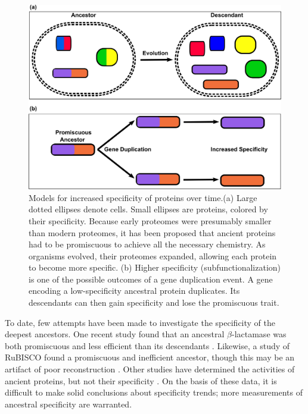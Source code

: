\begin{figure}
\centering \includegraphics{ch2-fig3} \caption[Models for increased specificity of proteins over time]{Models for increased specificity of proteins over time.(a) Large
dotted ellipses denote cells. Small ellipses are proteins, colored
by their specificity. Because early proteomes were presumably smaller
than modern proteomes, it has been proposed that ancient proteins
had to be promiscuous to achieve all the necessary chemistry. As organisms
evolved, their proteomes expanded, allowing each protein to become
more specific. (b) Higher specificity (subfunctionalization) is one
of the possible outcomes of a gene duplication event. A gene encoding
a low-specificity ancestral protein duplicates. Its descendants can
then gain specificity and lose the promiscuous trait.\label{samplefigure}}
\end{figure}

To date, few attempts have been made to investigate the specificity
of the deepest ancestors. One recent study found that an ancestral
$\beta$-lactamase was both promiscuous and less efficient than its
descendants \cite{risso_hyperstability_2013}. Likewise, a study of
RuBISCO found a promiscuous and inefficient ancestor, though this
may be an artifact of poor reconstruction \cite{ma_molecular_2016}.
Other studies have determined the activities of ancient proteins,
but not their specificity \cite{hobbs_origin_2012,akanuma_experimental_2013}.
On the basis of these data, it is difficult to make solid conclusions
about specificity trends; more measurements of ancestral specificity
are warranted.

